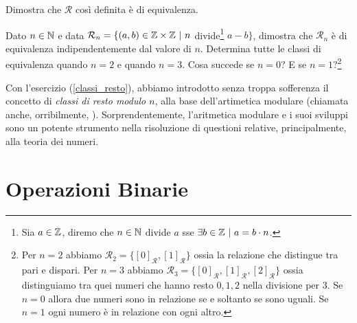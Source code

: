 		\begin{es}
			Dimostra che $\mathcal{R}$ così definita è di equivalenza.
		\end{es}
		\begin{es}\label{classi_resto}
			Dato $n\in\mathbb{N}$ e data $\mathcal{R}_n=\{(a,b)\in \mathbb{Z}\times\mathbb{Z}\ \rvert\  n$ divide\footnote{Sia $a\in\mathbb{Z}$, diremo che $n\in\mathbb{N}$ divide $a$ sse $\exists b\in\mathbb{Z}\ \rvert\  a=b\cdot n$.} $a-b\}$, dimostra che $\mathcal{R}_n$ è di equivalenza indipendentemente dal valore di $n$. Determina tutte le classi di equivalenza quando $n=2$ e quando $n=3$. Cosa succede se $n=0$? E se $n=1$?\footnote{Per $n=2$ abbiamo $\mathcal{R}_2=\{[0]_{\mathcal{R}}, [1]_{\mathcal{R}}\}$ ossia la relazione che distingue tra pari e dispari. Per $n=3$ abbiamo $\mathcal{R}_3=\{[0]_{\mathcal{R}}, [1]_{\mathcal{R}}, [2]_{\mathcal{R}}\}$ ossia distinguiamo tra quei numeri che hanno resto $0,1,2$ nella divisione per $3$. Se $n=0$ allora due numeri sono in relazione se e soltanto se sono uguali. Se $n=1$ ogni numero è in relazione con ogni altro.}
		\end{es}
		Con l'esercizio (\ref{classi_resto}), abbiamo introdotto senza troppa sofferenza il concetto di \emph{classi di resto modulo $n$}, alla base dell'artimetica modulare (chiamata anche, orribilmente, ).
		Sorprendentemente, l'aritmetica modulare e i suoi sviluppi sono un potente strumento nella risoluzione di questioni relative, principalmente, alla teoria dei numeri.
	
	\section{Operazioni Binarie}
		
